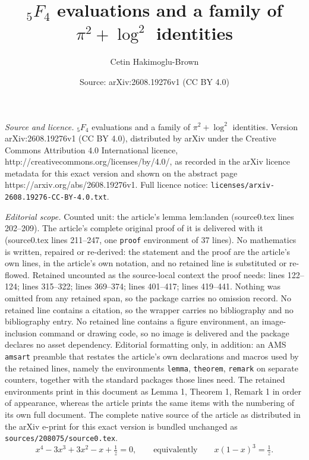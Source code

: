 \documentclass[10pt,a4paper]{amsart}
\title{${}_5F_4$ evaluations and a family of $\pi^2+\log^2$ identities}
\author{Cetin Hakimoglu-Brown}
\date{Source: arXiv:2608.19276v1 (CC BY 4.0)}
\begin{document}
\maketitle

\noindent\emph{Source and licence.} ${}_5F_4$ evaluations and a family of $\pi^2+\log^2$ identities. Version arXiv:2608.19276v1 (CC BY 4.0), distributed by arXiv under the Creative Commons Attribution 4.0 International licence, http://creativecommons.org/licenses/by/4.0/, as recorded in the arXiv licence metadata for this exact version and shown on the abstract page https://arxiv.org/abs/2608.19276v1. Full licence notice: \texttt{licenses/arxiv-2608.19276-CC-BY-4.0.txt}.\par\smallskip

\noindent\textit{Editorial scope.} Counted unit: the article's lemma lem:landen (source0.tex lines 202--209). The article's complete original proof of it is delivered with it (source0.tex lines 211--247, one \texttt{proof} environment of 37 lines). No mathematics is written, repaired or re-derived: the statement and the proof are the article's own lines, in the article's own notation, and no retained line is substituted or re-flowed.  Retained uncounted as the source-local context the proof needs: lines 122--124; lines 315--322; lines 369--374; lines 401--417; lines 419--441.  Nothing was omitted from any retained span, so the package carries no omission record.  No retained line contains a citation, so the wrapper carries no bibliography and no bibliography entry.  No retained line contains a figure environment, an image-inclusion command or drawing code, so no image is delivered and the package declares no asset dependency.  Editorial formatting only, in addition: an AMS \texttt{amsart} preamble that restates the article's own declarations and macros used by the retained lines, namely the environments \texttt{lemma}, \texttt{theorem}, \texttt{remark} on separate counters, together with the standard packages those lines need.  The retained environments print in this document as Lemma 1, Theorem 1, Remark 1 in order of appearance, whereas the article prints the same items with the numbering of its own full document.  The complete native source of the article as distributed in the arXiv e-print for this exact version is bundled unchanged as \texttt{sources/208075/source0.tex}.
\begin{equation}\label{eq:fiber}
  x^4-3x^3+3x^2-x+\tfrac1z=0,\qquad\text{equivalently}\qquad x(1-x)^3=\tfrac1z .
\end{equation}
\end{document}
